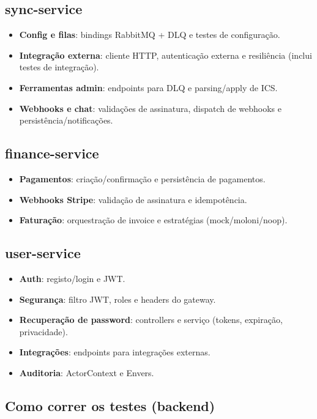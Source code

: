 \subsection{sync-service}
\begin{itemize}[nosep]
  \item \textbf{Config e filas}: bindings RabbitMQ + DLQ e testes de configuração.
  \item \textbf{Integração externa}: cliente HTTP, autenticação externa e resiliência (inclui testes de integração).
  \item \textbf{Ferramentas admin}: endpoints para DLQ e parsing/apply de ICS.
  \item \textbf{Webhooks e chat}: validações de assinatura, dispatch de webhooks e persistência/notificações.
\end{itemize}

\subsection{finance-service}
\begin{itemize}[nosep]
  \item \textbf{Pagamentos}: criação/confirmação e persistência de pagamentos.
  \item \textbf{Webhooks Stripe}: validação de assinatura e idempotência.
  \item \textbf{Faturação}: orquestração de invoice e estratégias (mock/moloni/noop).
\end{itemize}

\subsection{user-service}
\begin{itemize}[nosep]
  \item \textbf{Auth}: registo/login e JWT.
  \item \textbf{Segurança}: filtro JWT, roles e headers do gateway.
  \item \textbf{Recuperação de password}: controllers e serviço (tokens, expiração, privacidade).
  \item \textbf{Integrações}: endpoints para integrações externas.
  \item \textbf{Auditoria}: ActorContext e Envers.
\end{itemize}
\subsection{Como correr os testes (backend)}

